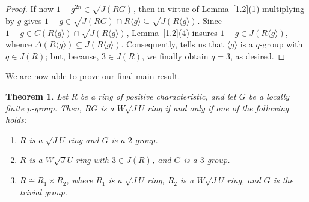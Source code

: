 \documentclass[12pt]{amsart}
\newtheorem{theorem}{Theorem}[section] \newtheorem{mtheorem}[theorem]{Main Theorem}
\begin{document}
\begin{proof}
If now $1 - g^{2n} \in \sqrt{J(RG)}$, then in virtue of Lemma~\ref{1.2}(1) multiplying by $g$ gives $1 - g \in \sqrt{J(RG)} \cap R\langle g \rangle \subseteq \sqrt{J(R\langle g \rangle)}$. Since $1 - g \in C(R\langle g \rangle) \cap \sqrt{J(R\langle g \rangle)}$, Lemma~\ref{1.2}(4) insures $1 - g \in J(R\langle g \rangle)$, whence $\Delta(R\langle g \rangle) \subseteq J(R\langle g \rangle)$. Consequently, \cite[Proposition 15(i)]{con} tells us that $\langle g \rangle$ is a $q$-group with $q \in J(R)$; but, because, $3 \in J(R)$, we finally obtain $q = 3$, as desired.
\end{proof}

We are now able to prove our final main result.

\begin{theorem} Let $R$ be a ring of positive characteristic, and let $G$ be a locally finite $p$-group. Then,
$RG$ is a $W\sqrt{J}U$ ring if and only if one of the following holds: 

\begin{enumerate} 
\item $R$ is a $\sqrt{J}U$ ring and $G$ is a $2$-group. 
\item $R$ is a $W\sqrt{J}U$ ring with $3 \in J(R)$, and $G$ is a $3$-group. 
\item $R \cong R_1 \times R_2$, where $R_1$ is a $\sqrt{J}U$ ring, $R_2$ is a $W\sqrt{J}U$ ring, and $G$ is the trivial group.
\end{enumerate} 
\end{theorem} 
\end{document}
